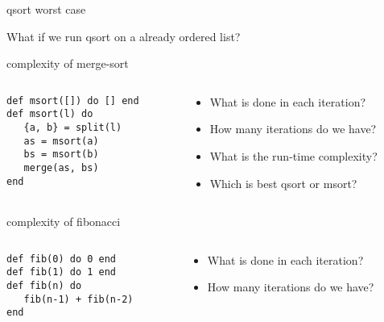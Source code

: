 \begin{frame}{qsort worst case}

What if we run qsort on a already ordered list?

\end{frame}


\begin{frame}[fragile]{complexity of merge-sort}

\begin{columns}
   \begin{column}{.5\linewidth}
    \begin{verbatim}
def msort([]) do [] end
def msort(l) do
   {a, b} = split(l)
   as = msort(a)
   bs = msort(b)
   merge(as, bs)
end
   \end{verbatim}
   \end{column}
   \begin{column}{.5\linewidth}
    \begin{itemize}
      \pause \item What is done in each iteration?
      \pause \item How many iterations do we have?       
      \pause \item What is the run-time complexity?       
      \pause \item Which is best qsort or msort?       
    \end{itemize}
   \end{column}
\end{columns}

\end{frame}

\begin{frame}[fragile]{complexity of fibonacci}

\begin{columns}
   \begin{column}{.5\linewidth}
    \begin{verbatim}
def fib(0) do 0 end
def fib(1) do 1 end
def fib(n) do 
   fib(n-1) + fib(n-2)
end
    \end{verbatim}
   \end{column}
   \begin{column}{.5\linewidth}
    \begin{itemize}
      \pause \item What is done in each iteration?
      \pause \item How many iterations do we have?       
    \end{itemize}
   \end{column}
\end{columns}

\end{frame}

